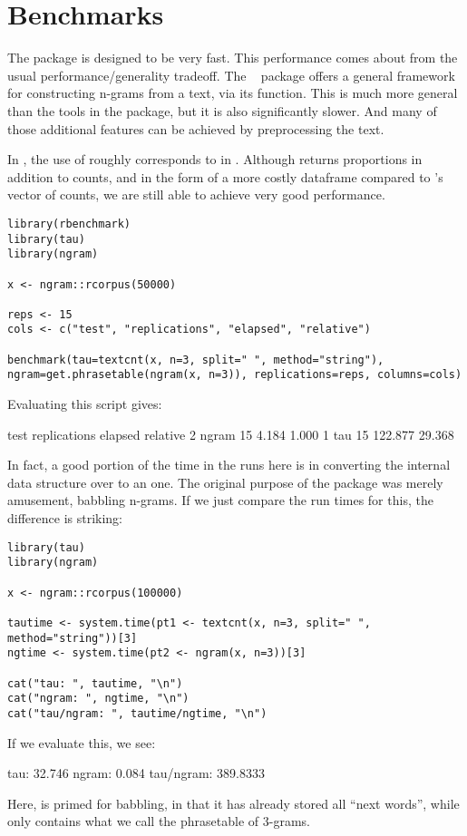 \section{Benchmarks}\label{sec:benchmarks}

The  package is designed to be very fast.  This performance comes
about from the usual performance/generality tradeoff.  
The ~\citep{tau} package offers a general framework for constructing
n-grams from a text, via its  function.  This is much more
general than the tools in the  package, but it is also
significantly slower.  And many of those additional features can be achieved
by preprocessing the text.

In , the use of  roughly corresponds
to  in .  Although
 returns proportions in addition to counts, and in the
form of a more costly dataframe compared to 's vector of counts, we
are still able to achieve very good performance.
\begin{lstlisting}[language=rr]
library(rbenchmark)
library(tau)
library(ngram)

x <- ngram::rcorpus(50000)

reps <- 15
cols <- c("test", "replications", "elapsed", "relative")

benchmark(tau=textcnt(x, n=3, split=" ", method="string"), ngram=get.phrasetable(ngram(x, n=3)), replications=reps, columns=cols)
\end{lstlisting}
Evaluating this script gives:
\begin{Code}
   test replications elapsed relative
2 ngram           15   4.184    1.000
1   tau           15 122.877   29.368
\end{Code}

In fact, a good portion of the time in the  runs here is in converting the
internal  data structure over to an  one.  The original
purpose of the  package was merely amusement, babbling n-grams.
If we just compare the run times for this, the difference is striking:
\begin{lstlisting}[language=rr]
library(tau)
library(ngram)

x <- ngram::rcorpus(100000)

tautime <- system.time(pt1 <- textcnt(x, n=3, split=" ", method="string"))[3]
ngtime <- system.time(pt2 <- ngram(x, n=3))[3]

cat("tau: ", tautime, "\n")
cat("ngram: ", ngtime, "\n")
cat("tau/ngram: ", tautime/ngtime, "\n")
\end{lstlisting}
If we evaluate this, we see:
\begin{Code}
tau:  32.746 
ngram:  0.084 
tau/ngram:  389.8333 
\end{Code}
Here,  is primed for babbling, in that it has already stored all
``next words'', while  only contains what we call the phrasetable of
3-grams.
